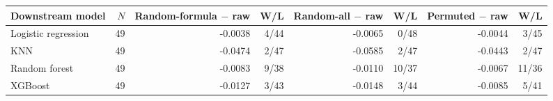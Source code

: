 \begin{tabular}{lrrrrrrr}
\toprule
Downstream model & $N$ & Random-formula $-$ raw & W/L & Random-all $-$ raw & W/L & Permuted $-$ raw & W/L \\
\midrule
Logistic regression & 49 & -0.0038 & 4/44 & -0.0065 & 0/48 & -0.0044 & 3/45 \\
KNN & 49 & -0.0474 & 2/47 & -0.0585 & 2/47 & -0.0443 & 2/47 \\
Random forest & 49 & -0.0083 & 9/38 & -0.0110 & 10/37 & -0.0067 & 11/36 \\
XGBoost & 49 & -0.0127 & 3/43 & -0.0148 & 3/44 & -0.0085 & 5/41 \\
\bottomrule
\end{tabular}
